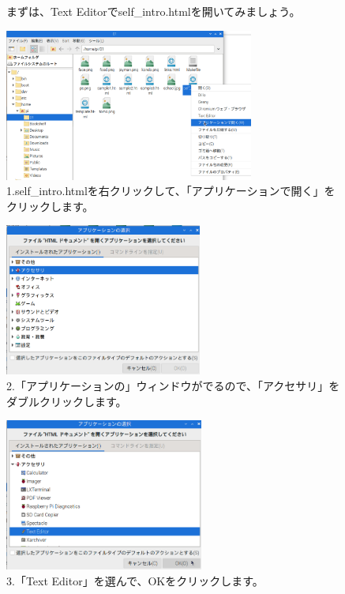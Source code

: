 \documentclass[a4paper,12pt]{jarticle}
\begin{document}
\begin{figure}[ht]
  \begin{minipage}{\textwidth}
    \flushleft
    まずは、Text
    Editorでself\_intro.htmlを開いてみましょう。
    \begin{minipage}{0.45\linewidth}
      \includegraphics[width=\linewidth,height=5cm]{textbook-img1040.png}\\
      1.self\_intro.htmlを右クリックして、「アプリケーションで開く」をクリックします。
    \end{minipage}
    \hfill
    \vspace{20pt}
    \begin{minipage}{0.45\linewidth}
      \includegraphics[width=\linewidth,height=5cm]{textbook-img1041.png}\\
      2.「アプリケーションの」ウィンドウがでるので、「アクセサリ」をダブルクリックします。
    \end{minipage}
    \begin{minipage}{0.45\linewidth}
      \includegraphics[width=\linewidth,height=5cm]{textbook-img1042.png}\\
      3.「Text Editor」を選んで、OKをクリックします。
    \end{minipage}
  \end{minipage}


\end{figure}
\end{document}
